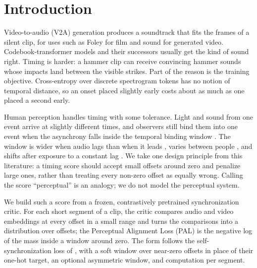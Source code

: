 \section{Introduction}
\label{sec:intro}

Video-to-audio (V2A) generation produces a soundtrack that fits the frames of a silent clip, for uses such as Foley for film and sound for generated video. Codebook-transformer models \citep{iashin2021taming} and their successors usually get the kind of sound right. Timing is harder: a hammer clip can receive convincing hammer sounds whose impacts land between the visible strikes. Part of the reason is the training objective. Cross-entropy over discrete spectrogram tokens has no notion of temporal distance, so an onset placed slightly early costs about as much as one placed a second early.

Human perception handles timing with some tolerance. Light and sound from one event arrive at slightly different times, and observers still bind them into one event when the asynchrony falls inside the temporal binding window \citep{wallace2014construct}. The window is wider when audio lags than when it leads \citep{dixon1980detection,vanwassenhove2007temporal,vroomen2010perception}, varies between people \citep{stevenson2012individual}, and shifts after exposure to a constant lag \citep{fujisaki2004recalibration}. We take one design principle from this literature: a timing score should accept small offsets around zero and penalize large ones, rather than treating every non-zero offset as equally wrong. Calling the score ``perceptual'' is an analogy; we do not model the perceptual system.

We build such a score from a frozen, contrastively pretrained synchronization critic. For each short segment of a clip, the critic compares audio and video embeddings at every offset in a small range and turns the comparisons into a distribution over offsets; the Perceptual Alignment Loss (PAL) is the negative log of the mass inside a window around zero. The form follows the self-synchronization loss of \citet{niu2023synchronization}, with a soft window over near-zero offsets in place of their one-hot target, an optional asymmetric window, and computation per segment.

